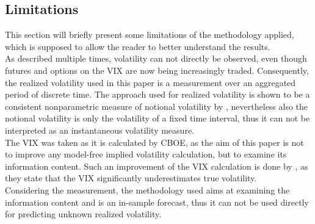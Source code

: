 \subsection{Limitations}\label{sec:43Limits}
This section will briefly present some limitations of the methodology applied, which is supposed to allow the reader to better understand the results.\\
As described multiple times, volatility can not directly be observed, even though futures and options on the \ac{VIX} are now being increasingly traded. Consequently, the realized volatility used in this paper is a measurement over an aggregated period of discrete time. The approach used for realized volatility is shown to be a consistent nonparametric measure of notional volatility by \textcite{andersen2001}, nevertheless also the notional volatility is only the volatility of a fixed time interval, thus it can not be interpreted as an instantaneous volatility measure.\\
The VIX was taken as it is calculated by \ac{CBOE}, as the aim of this paper is not to improve any model-free implied volatility calculation, but to examine its information content. Such an improvement of the \ac{VIX} calculation is done by \textcite{jiang2007}, as they state that the VIX significantly underestimates true volatility.\\
Considering the measurement, the methodology used aims at examining the information content and is an in-sample forecast, thus it can not be used directly for predicting unknown realized volatility.

